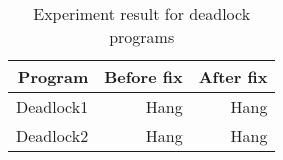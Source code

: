 \begin{table}[htbp]
  \centering
    \begin{tabular}{|r|r|r|} \hline
    Program & Before fix & After fix \\ \hline
    Deadlock1 & Hang & Hang \\ \hline
    Deadlock2 & Hang & Hang \\ \hline
    \end{tabular}%
  \caption{Experiment result for deadlock programs}
  \label{tab:dl}%
\end{table}%
